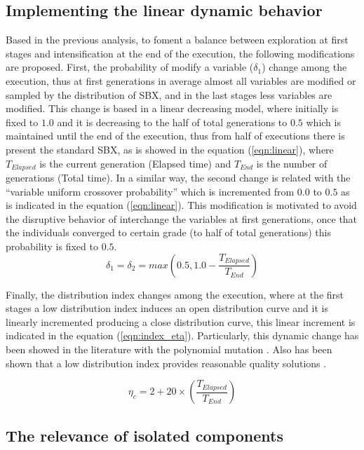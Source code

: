\subsection{Implementing the linear dynamic behavior}
Based in the previous analysis, to foment a balance between exploration at first stages and intensification at the end of the execution, the following modifications are proposed.
%
First, the probability of modify a variable ($\delta_1$) change among the execution, thus at first generations in average almost all variables are modified or sampled by the distribution of SBX, and in the last stages less variables are modified.
%
This change is based in a linear decreasing model, where initially is fixed to $1.0$ and it is decreasing to the half of total generations to $0.5$ which is maintained until the end of the execution, thus from half of executions there is present the standard SBX, as is showed in the equation (\ref{eqn:linear}), where $T_{Elapsed}$ is the current generation (Elapsed time) and $T_{End}$ is the number of generations (Total time).
%
In a similar way, the second change is related with the ``variable uniform crossover probability'' which is incremented from $0.0$ to $0.5$ as is indicated in the equation (\ref{eqn:linear}).
%
This modification is motivated to avoid the disruptive behavior of interchange the variables at first generations, once that the individuals converged to certain grade (to half of total generations) this probability is fixed to $0.5$.
\begin{equation}\label{eqn:linear}
	\delta_1 = \delta_2 = max \left (0.5, 1.0 - \frac{T_{Elapsed}}{T_{End}} \right )
\end{equation}

%
Finally, the distribution index changes among the execution, where at the first stages a low distribution index induces an open distribution curve and it is linearly incremented producing a close distribution curve, this linear increment is indicated in the equation (\ref{eqn:index_eta}).
%
Particularly, this dynamic change has been showed in the literature with the polynomial mutation \cite{zitzler1999multiobjective}.
%
Also has been shown that a low distribution index provides reasonable quality solutions \cite{hamdan2012distribution}.

\begin{equation}\label{eqn:index_eta}
 \eta_c = 2 + 20 \times \left ( \frac{T_{Elapsed}}{T_{End}} \right)
\end{equation}


\subsection{The relevance of isolated components}

